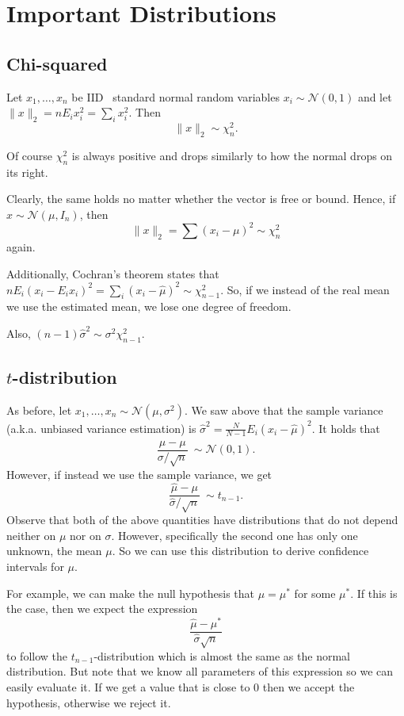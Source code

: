 \documentclass[11pt]{article}
\theoremstyle{definition}
\newcommand{\IID}{\textsf{IID}}
\newcommand{\Normal}[2]{\ensuremath{\mathcal N (#1, #2)}}
\begin{document}
\section{Important Distributions}

\subsection{Chi-squared}
Let $x_1,\ldots,x_n$ be \IID~ standard normal random variables
$x_i\sim\mathcal{N}(0,1)$ and let $\|x\|_2=nE_ix_i^2=\sum_i x_i^2$. Then
$$\|x\|_2\sim\chi_n^2.$$

Of course $\chi_n^2$ is always positive and drops similarly to how the normal
drops on its right.

Clearly, the same holds no matter whether the vector is free or bound. Hence, if
$x\sim\mathcal{N}(\mu,I_n)$, then $$\|x\|_2=\sum(x_i-\mu)^2\sim\chi_n^2$$ again.

Additionally, Cochran's theorem states that
$nE_i(x_i-E_ix_i)^2=\sum_i(x_i-\hat\mu)^2\sim\chi_{n-1}^2$. So, if we instead of
the real mean we use the estimated mean, we lose one degree of freedom.

Also, $(n-1)\hat\sigma^2\sim \sigma^2\chi_{n-1}^2$.

\subsection{$t$-distribution}
As before, let $x_1,\ldots,x_n\sim\Normal\mu{\sigma^2}$. We saw above that the
sample variance (a.k.a. unbiased variance estimation) is
$\hat\sigma^2=\frac{N}{N-1}E_i(x_i-\hat\mu)^2$. It holds that
\begin{equation}
	\frac{\hat\mu-\mu}{\sigma/\sqrt n}~\sim\Normal{0}{1}. \tag{See Wiki}
\end{equation}
However, if instead we use the sample variance, we get
\begin{equation}
	\frac{\hat\mu-\mu}{\hat\sigma/\sqrt n}~\sim t_{n-1}.
\end{equation}
Observe that both of the above quantities have distributions that do not depend
neither on $\mu$ nor on $\sigma$. However, specifically the second one has only
one unknown, the mean $\mu$. So we can use this distribution to derive
confidence intervals for $\mu$.

For example, we can make the null hypothesis that $\mu=\mu^*$ for some $\mu^*$.
If this is the case, then we expect the expression
\[\frac{\hat\mu-\mu^*}{\hat\sigma\sqrt{n}}\] to follow the
$t_{n-1}$-distribution which is almost the same as the normal distribution. But
note that we know all parameters of this expression so we can easily evaluate
it. If we get a value that is close to 0 then we accept the hypothesis,
otherwise we reject it.
\end{document}
